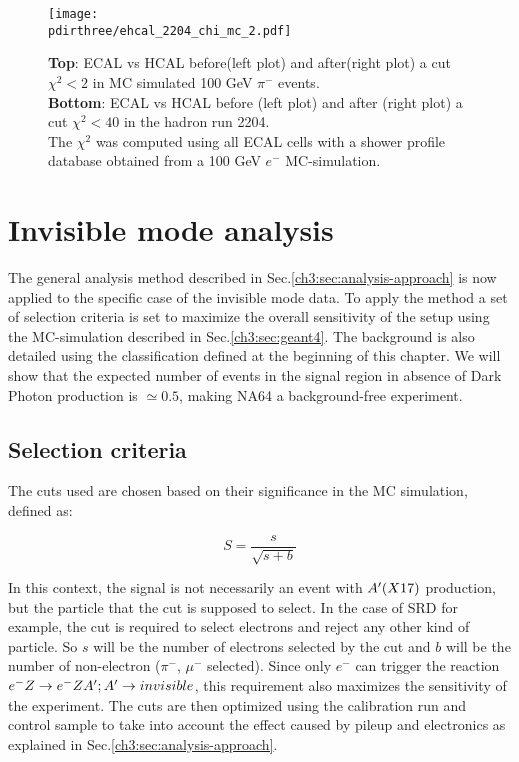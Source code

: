 \begin{figure}[h!]
  \begin{center}
    \texttt{[image: \\pdirthree/ehcal\_2204\_chi\_mc\_2.pdf]}
  \end{center}
  \caption{\textbf{Top}: ECAL vs HCAL before(left plot) and
    after(right plot) a cut
    $\chi^2<2$ in MC simulated 100 GeV $\pi^-$ events. \\
    \textbf{Bottom}: ECAL vs HCAL before (left plot) and after (right
    plot) a cut
    $\chi^2<40$ in the hadron run 2204.\\
    The $\chi^2$ was computed using all ECAL cells with a shower
    profile database obtained from a 100 GeV $e^-$ MC-simulation. }
  \label{fig:ehcal_hadr}
\end{figure}
\fi

\section{Invisible mode analysis}
\label{ch3:sec:analysis-invis}

The general analysis method described in Sec.\ref{ch3:sec:analysis-approach} is now applied to the specific case of the invisible mode data. To apply the method a set of selection criteria is set to maximize the overall sensitivity of the setup using the MC-simulation described in Sec.\ref{ch3:sec:geant4}. The background is also detailed using the classification defined at the beginning of this chapter. We will show that the expected number of events in the signal region in absence of Dark Photon production is $\simeq 0.5$, making NA64 a background-free experiment.

\subsection{Selection criteria}
\label{ch3:sec:selection-criteria}

The cuts used are chosen based on their significance in the MC simulation, defined as:

\begin{equation}
  \label{eq:significance}
  S = \frac{s}{\sqrt{s + b}}
\end{equation}

In this context, the signal is not necessarily an event with $A'(X17)$ production, but the particle that the cut is supposed to select.
In the case of SRD for example, the cut is required to select electrons and reject any other kind of particle. So $s$ will be the number of electrons selected by the cut and $b$ will be the number of non-electron ($\pi^-$, $\mu^-$ selected). Since only $e^{-}$ can trigger the reaction $e^- Z \to e^- Z A'; A' \to invisible$, this requirement also maximizes the sensitivity of the experiment. The cuts are then optimized using the calibration run and control sample to take into account the effect caused by pileup and electronics as explained in Sec.\ref{ch3:sec:analysis-approach}.

